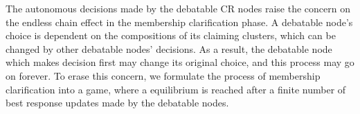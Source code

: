 \documentclass[times]{ettauth}
\theoremstyle{mytheoremstyle}
\theoremstyle{mytheoremstyle}
\theoremstyle{mytheoremstyle}
\begin{document}
The autonomous decisions made by the debatable CR nodes raise the concern on the endless chain effect in the membership clarification phase.
A debatable node's choice is dependent on the compositions of its claiming clusters, which can be changed by other debatable nodes' decisions.
As a result, the debatable node which makes decision first may change its original choice, and this process may go on forever.
To erase this concern, we formulate the process of membership clarification into a game, where a equilibrium is reached after a finite number of best response updates made by the debatable nodes.

\end{document}
